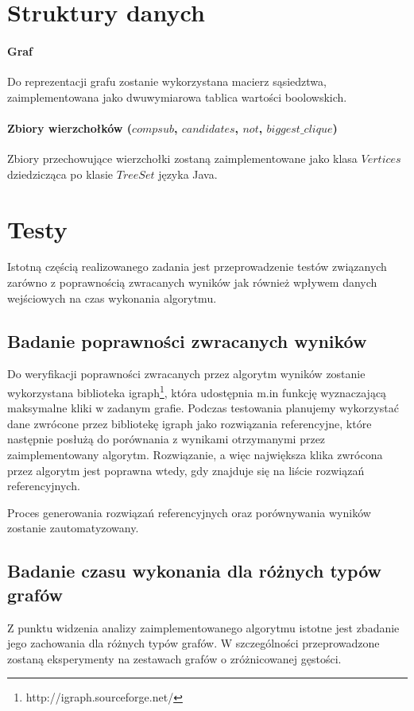 \documentclass[12pt, a4paper]{article}
\begin{document}
\section{Struktury danych}
\paragraph{Graf}
Do reprezentacji grafu zostanie wykorzystana macierz sąsiedztwa, zaimplementowana jako dwuwymiarowa tablica wartości boolowskich.

\paragraph{Zbiory wierzchołków ($compsub$, $candidates$, $not$, $biggest\_clique$)}
Zbiory przechowujące wierzchołki zostaną zaimplementowane jako klasa $Vertices$ dziedzicząca po klasie $TreeSet$ języka Java.

\section{Testy}
Istotną częścią realizowanego zadania jest przeprowadzenie testów związanych zarówno z poprawnością zwracanych wyników jak również wpływem danych wejściowych na czas wykonania algorytmu.

\subsection{Badanie poprawności zwracanych wyników}
Do weryfikacji poprawności zwracanych przez algorytm wyników zostanie wykorzystana biblioteka igraph\footnote{http://igraph.sourceforge.net/}, która udostępnia m.in funkcję wyznaczającą maksymalne kliki w zadanym grafie. Podczas testowania planujemy wykorzystać dane zwrócone przez bibliotekę igraph jako rozwiązania referencyjne, które następnie posłużą do porównania z wynikami otrzymanymi przez zaimplementowany algorytm. Rozwiązanie, a więc największa klika zwrócona przez algorytm jest poprawna wtedy, gdy znajduje się na liście rozwiązań referencyjnych.

Proces generowania rozwiązań referencyjnych oraz porównywania wyników zostanie zautomatyzowany.
\subsection{Badanie czasu wykonania dla różnych typów grafów}
Z punktu widzenia analizy zaimplementowanego algorytmu istotne jest zbadanie jego zachowania dla różnych typów grafów. W szczególności przeprowadzone zostaną eksperymenty na zestawach grafów o zróżnicowanej gęstości.



\end{document}
